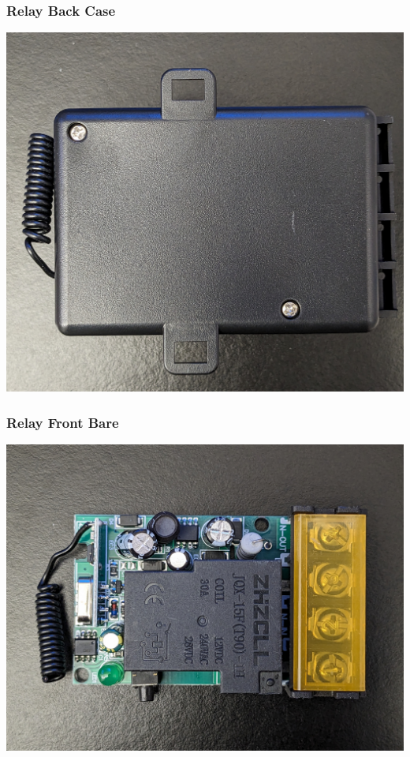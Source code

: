 \documentclass{beamer}
\begin{document}
\begin{frame}
\frametitle{Relay Back Case}
\includegraphics[width=\textwidth]{../Pics/device/relay_back_case.jpg}
\end{frame}

\begin{frame}
\frametitle{Relay Front Bare}
\includegraphics[width=\textwidth]{../Pics/device/relay_front_bare.jpg}
\end{frame}
\end{document}
